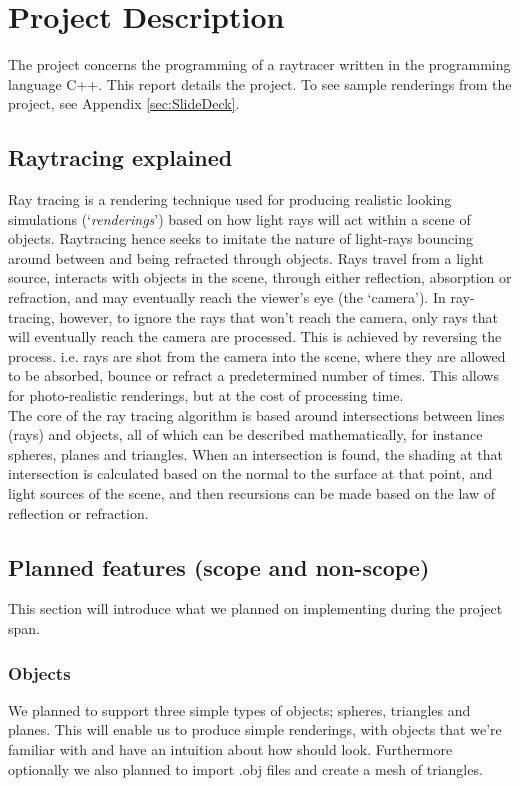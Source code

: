 \section{Project Description}
The project concerns the programming of a raytracer written in the programming language C++. This report details the project. To see sample renderings from the project, see Appendix \ref{sec:SlideDeck}. 

\subsection{Raytracing explained}
Ray tracing is a rendering technique used for producing realistic looking simulations (‘\textit{renderings}’) based on how light rays will act within a scene of objects. Raytracing hence seeks to imitate the nature of light-rays bouncing around between and being refracted through objects. Rays travel from a light source, interacts with objects in the scene, through either reflection, absorption or refraction, and may eventually reach the viewer’s eye (the ‘camera’). In ray-tracing, however, to ignore the rays that won’t reach the camera, only rays that will eventually reach the camera are processed. This is achieved by reversing the process. i.e. rays are shot from the camera into the scene, where they are allowed to be absorbed, bounce or refract a predetermined number of times. This allows for photo-realistic renderings, but at the cost of processing time. \\

The core of the ray tracing algorithm is based around intersections between lines (rays) and objects, all of which can be described mathematically, for instance spheres, planes and triangles. When an intersection is found, the shading at that intersection is calculated based on the normal to the surface at that point, and light sources of the scene, and then recursions can be made based on the law of reflection or refraction.

\subsection{Planned features (scope and non-scope)}
This section will introduce what we planned on implementing during the project span.

\subsubsection{Objects}
We planned to support three simple types of objects; spheres, triangles and planes. This will enable us to produce simple renderings, with objects that we’re familiar with and have an intuition about how should look. Furthermore optionally we also planned to import .obj files and create a mesh of triangles.

